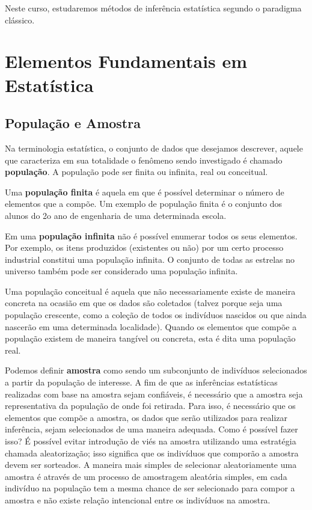\documentclass[
]{book}
\theoremstyle{definition}
\theoremstyle{definition}
\theoremstyle{definition}
\theoremstyle{remark}
\begin{document}
Neste curso, estudaremos métodos de inferência estatística segundo o paradigma clássico.

\hypertarget{elementos-fundamentais-em-estatuxedstica}{%
\section{Elementos Fundamentais em Estatística}\label{elementos-fundamentais-em-estatuxedstica}}

\hypertarget{populauxe7uxe3o-e-amostra}{%
\subsection*{População e Amostra}\label{populauxe7uxe3o-e-amostra}}

Na terminologia estatística, o conjunto de dados que desejamos descrever, aquele que caracteriza em sua totalidade o fenômeno sendo investigado é chamado \textbf{população}. A população pode ser finita ou infinita, real ou conceitual.

Uma \textbf{população finita} é aquela em que é possível determinar o número de elementos que a compõe. Um exemplo de população finita é o conjunto dos alunos do 2o ano de engenharia de uma determinada escola.

Em uma \textbf{população infinita} não é possível enumerar todos os seus elementos. Por exemplo, os itens produzidos (existentes ou não) por um certo processo industrial constitui uma população infinita. O conjunto de todas as estrelas no universo também pode ser considerado uma população infinita.

Uma população conceitual é aquela que não necessariamente existe de maneira concreta na ocasião em que os dados são coletados (talvez porque seja uma população crescente, como a coleção de todos os indivíduos nascidos ou que ainda nascerão em uma determinada localidade). Quando os elementos que compõe a população existem de maneira tangível ou concreta, esta é dita uma população real.

Podemos definir \textbf{amostra} como sendo um subconjunto de indivíduos selecionados a partir da população de interesse. A fim de que as inferências estatísticas realizadas com base na amostra sejam confiáveis, é necessário que a amostra seja representativa da população de onde foi retirada. Para isso, é necessário que os elementos que compõe a amostra, os dados que serão utilizados para realizar inferência, sejam selecionados de uma maneira adequada. Como é possível fazer isso? É possível evitar introdução de viés na amostra utilizando uma estratégia chamada aleatorização; isso significa que os indivíduos que comporão a amostra devem ser sorteados. A maneira mais simples de selecionar aleatoriamente uma amostra é através de um processo de amostragem aleatória simples, em cada indivíduo na população tem a mesma chance de ser selecionado para compor a amostra e não existe relação intencional entre os indivíduos na amostra.
\end{document}
